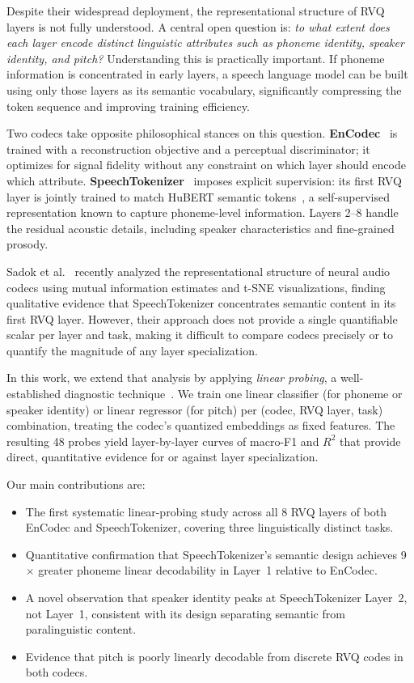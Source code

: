 \documentclass[10pt,twocolumn]{article}
\begin{document}
Despite their widespread deployment, the representational structure of
RVQ layers is not fully understood. A central open question is: \emph{to
what extent does each layer encode distinct linguistic attributes such as
phoneme identity, speaker identity, and pitch?} Understanding this is
practically important. If phoneme information is concentrated in early
layers, a speech language model can be built using only those layers as
its semantic vocabulary, significantly compressing the token sequence
and improving training efficiency.

Two codecs take opposite philosophical stances on this question.
\textbf{EnCodec}~\cite{defossez2023} is trained with a reconstruction
objective and a perceptual discriminator; it optimizes for signal
fidelity without any constraint on which layer should encode which
attribute. \textbf{SpeechTokenizer}~\cite{zhang2024} imposes explicit
supervision: its first RVQ layer is jointly trained to match HuBERT
semantic tokens~\cite{hsu2021}, a self-supervised representation known
to capture phoneme-level information. Layers 2--8 handle the residual
acoustic details, including speaker characteristics and fine-grained
prosody.

Sadok et al.~\cite{sadok2025} recently analyzed the representational
structure of neural audio codecs using mutual information estimates and
t-SNE visualizations, finding qualitative evidence that SpeechTokenizer
concentrates semantic content in its first RVQ layer. However, their
approach does not provide a single quantifiable scalar per layer and
task, making it difficult to compare codecs precisely or to quantify
the magnitude of any layer specialization.

In this work, we extend that analysis by applying \emph{linear probing},
a well-established diagnostic technique~\cite{alain2016,conneau2018}.
We train one linear classifier (for phoneme or speaker identity) or
linear regressor (for pitch) per (codec, RVQ layer, task) combination,
treating the codec's quantized embeddings as fixed features. The
resulting 48 probes yield layer-by-layer curves of macro-F1 and $R^2$
that provide direct, quantitative evidence for or against layer
specialization.

Our main contributions are:
\begin{itemize}
  \item The first systematic linear-probing study across all 8 RVQ
        layers of both EnCodec and SpeechTokenizer, covering three
        linguistically distinct tasks.
  \item Quantitative confirmation that SpeechTokenizer's semantic
        design achieves 9$\times$ greater phoneme linear
        decodability in Layer~1 relative to EnCodec.
  \item A novel observation that speaker identity peaks at
        SpeechTokenizer Layer~2, not Layer~1, consistent with its
        design separating semantic from paralinguistic content.
  \item Evidence that pitch is poorly linearly decodable from
        discrete RVQ codes in both codecs.
\end{itemize}
\end{document}
